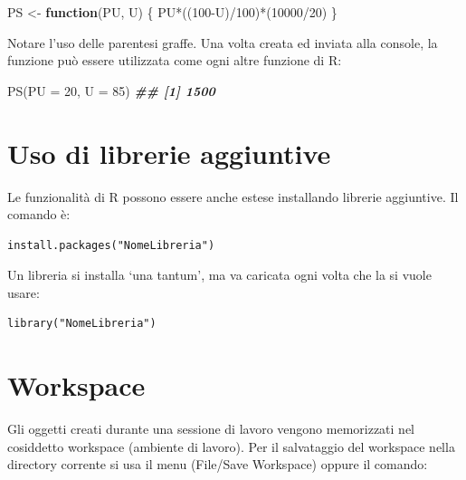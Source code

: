 \documentclass[
  12pt,
]{book}
\newenvironment{Shaded}{\begin{snugshade}}{\end{snugshade}}
\newcommand{\AttributeTok}[1]{\textcolor[rgb]{0.77,0.63,0.00}{#1}}
\newcommand{\ControlFlowTok}[1]{\textcolor[rgb]{0.13,0.29,0.53}{\textbf{#1}}}
\newcommand{\DecValTok}[1]{\textcolor[rgb]{0.00,0.00,0.81}{#1}}
\newcommand{\DocumentationTok}[1]{\textcolor[rgb]{0.56,0.35,0.01}{\textbf{\textit{#1}}}}
\newcommand{\FunctionTok}[1]{\textcolor[rgb]{0.00,0.00,0.00}{#1}}
\newcommand{\NormalTok}[1]{#1}
\newcommand{\OtherTok}[1]{\textcolor[rgb]{0.56,0.35,0.01}{#1}}
\newcommand{\SpecialCharTok}[1]{\textcolor[rgb]{0.00,0.00,0.00}{#1}}
\begin{document}
\begin{Shaded}
\begin{Highlighting}[]
\NormalTok{PS  }\OtherTok{\textless{}{-}}  \ControlFlowTok{function}\NormalTok{(PU, U) \{}
\NormalTok{  PU}\SpecialCharTok{*}\NormalTok{((}\DecValTok{100}\SpecialCharTok{{-}}\NormalTok{U)}\SpecialCharTok{/}\DecValTok{100}\NormalTok{)}\SpecialCharTok{*}\NormalTok{(}\DecValTok{10000}\SpecialCharTok{/}\DecValTok{20}\NormalTok{)}
\NormalTok{\}}
\end{Highlighting}
\end{Shaded}

Notare l'uso delle parentesi graffe. Una volta creata ed inviata alla console, la funzione può essere utilizzata come ogni altre funzione di R:

\begin{Shaded}
\begin{Highlighting}[]
\FunctionTok{PS}\NormalTok{(}\AttributeTok{PU =} \DecValTok{20}\NormalTok{, }\AttributeTok{U =} \DecValTok{85}\NormalTok{)}
\DocumentationTok{\#\# [1] 1500}
\end{Highlighting}
\end{Shaded}

\hypertarget{uso-di-librerie-aggiuntive}{%
\section{Uso di librerie aggiuntive}\label{uso-di-librerie-aggiuntive}}

Le funzionalità di R possono essere anche estese installando librerie aggiuntive. Il comando è:

\begin{verbatim}
install.packages("NomeLibreria")
\end{verbatim}

Un libreria si installa `una tantum', ma va caricata ogni volta che la si vuole usare:

\begin{verbatim}
library("NomeLibreria")
\end{verbatim}

\hypertarget{workspace}{%
\section{Workspace}\label{workspace}}

Gli oggetti creati durante una sessione di lavoro vengono memorizzati nel cosiddetto workspace (ambiente di lavoro). Per il salvataggio del workspace nella directory corrente si usa il menu (File/Save Workspace) oppure il comando:
\end{document}
